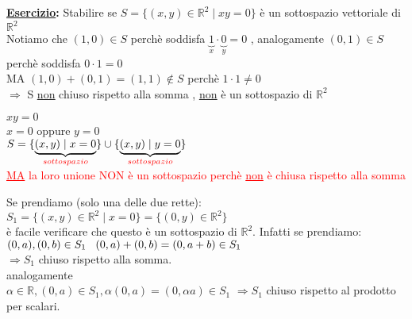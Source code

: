 \textbf{\underline{Esercizio}: } \textsf{\small Stabilire se $S = \{ (x,y) \in \mathbb{R}^2 \mid xy = 0\}$ è un sottospazio vettoriale di $\mathbb{R}^2$} \\

\textsf{\small Notiamo che $(1,0) \in S$ perchè soddisfa $\underbrace{1} _{x} \cdot \underbrace{0} _{y} = 0$ , analogamente $(0,1) \in S$ perchè soddisfa $0 \cdot 1 = 0$}\\
\textsf{\small MA $(1,0) + (0,1) = (1,1) \notin S$ perchè $1 \cdot 1 \neq 0$}\\
$\Rightarrow$ \textsf{\small S \underline{\underline{non}} chiuso rispetto alla somma , \underline{\underline{non}} è un sottospazio di $\mathbb{R}^2$}\\

\noindent\begin{minipage}{.5\linewidth}
\end{minipage}
\begin{minipage}{.45\linewidth}
	$xy = 0$ \\
	$x = 0$ oppure $ y = 0$ \\
	$S = \{ \underbrace{(x,y) \mid x = 0} _{\textcolor{red}{sottospazio}}\} \cup \{ \underbrace{(x,y) \mid y = 0} _{\textcolor{red}{sottospazio}}\}$
	\\
	\textsf{\small \textcolor{red}{\underline{MA} la loro unione NON è un sottospazio perchè \underline{non} è chiusa rispetto alla somma}}\\
\end{minipage}
\textsf{\small Se prendiamo (solo una delle due rette): }\\
$ S_1 = \{(x,y) \in \mathbb{R}^2 \mid x = 0\} = \{(0,y) \in \mathbb{R}^2\}$\\
\textsf{\small è facile verificare che questo è un sottospazio di $\mathbb{R}^2$. Infatti se prendiamo:}\\
$ (0, a), (0,b) \in S_1 \hspace{0.3cm} (0, a) + (0, b) = (0, a + b) \in S_1$ \\
$\Rightarrow S_1$ chiuso rispetto alla somma. \\
analogamente\\
$\alpha \in \mathbb{R}, (0,a) \in S_1 , \alpha(0, a) = (0, \alpha a) \in S_1$
$\Rightarrow S_1$ chiuso rispetto al prodotto per scalari. \vspace{0.2cm} 

